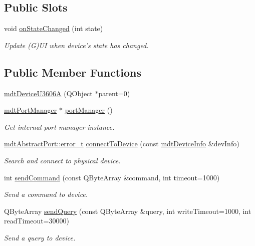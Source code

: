 \subsection*{Public Slots}
\begin{DoxyCompactItemize}
\item 
\hypertarget{classmdt_device_u3606_a_a94a6f8b3f64cd35b33204c66816f3f6a}{
void \hyperlink{classmdt_device_u3606_a_a94a6f8b3f64cd35b33204c66816f3f6a}{onStateChanged} (int state)}
\label{classmdt_device_u3606_a_a94a6f8b3f64cd35b33204c66816f3f6a}

\begin{DoxyCompactList}\small\item\em Update (G)UI when device's state has changed. \end{DoxyCompactList}\end{DoxyCompactItemize}
\subsection*{Public Member Functions}
\begin{DoxyCompactItemize}
\item 
\hyperlink{classmdt_device_u3606_a_a91201ae14df7b553a947b5857eaa1c65}{mdtDeviceU3606A} (QObject $\ast$parent=0)
\item 
\hypertarget{classmdt_device_u3606_a_a48a23abc92df9064c2d21411745160e5}{
\hyperlink{classmdt_port_manager}{mdtPortManager} $\ast$ \hyperlink{classmdt_device_u3606_a_a48a23abc92df9064c2d21411745160e5}{portManager} ()}
\label{classmdt_device_u3606_a_a48a23abc92df9064c2d21411745160e5}

\begin{DoxyCompactList}\small\item\em Get internal port manager instance. \end{DoxyCompactList}\item 
\hyperlink{classmdt_abstract_port_ad4121bb930c95887e77f8bafa065a85e}{mdtAbstractPort::error\_\-t} \hyperlink{classmdt_device_u3606_a_acf3b48b13bc179ad4f94b3011b7d607a}{connectToDevice} (const \hyperlink{classmdt_device_info}{mdtDeviceInfo} \&devInfo)
\begin{DoxyCompactList}\small\item\em Search and connect to physical device. \end{DoxyCompactList}\item 
int \hyperlink{classmdt_device_u3606_a_aa9045c25f6be6797b21ea98b4958e8f1}{sendCommand} (const QByteArray \&command, int timeout=1000)
\begin{DoxyCompactList}\small\item\em Send a command to device. \end{DoxyCompactList}\item 
QByteArray \hyperlink{classmdt_device_u3606_a_a637c4b440e9c4905c11c16a056e2c7ad}{sendQuery} (const QByteArray \&query, int writeTimeout=1000, int readTimeout=30000)
\begin{DoxyCompactList}\small\item\em Send a query to device. \end{DoxyCompactList}\end{DoxyCompactItemize}


